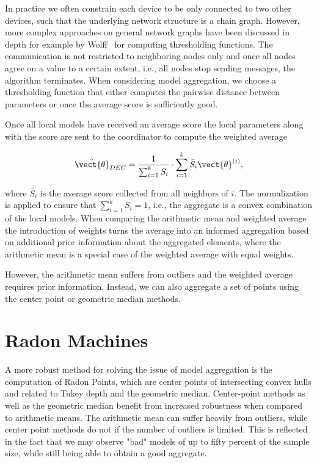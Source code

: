 

In practice we often constrain each device to be only connected to two other devices, such that  the underlying network structure is a chain graph.
However, more complex approaches on general network graphs have been discussed in depth for example by Wolff~\cite{wolff2013local} for computing thresholding functions.
The communication is not restricted to neighboring nodes only and once all nodes agree on a value to a certain extent, i.e., all nodes stop sending messages, the algorithm terminates.
When considering model aggregation, we choose a thresholding function that either computes the pairwise distance between parameters or once the average score is sufficiently good.

Once all local models have received an average score the local parameters along with the score are sent to the coordinator to compute the weighted average

\begin{equation}
    \label{eq:scorenorm}
    \tilde{\vect{\theta}}_{DEC} = \frac{1}{\sum_{i=1}^k S_i} \cdot \sum_{i=1}^k \bar{S}_i \vect{\theta}^{(i)},
\end{equation}

where $\bar{S}_i$ is the average score collected from all neighbors of $i$. 
The normalization is applied to ensure that $\sum_{i=1}^k S_i = 1$, i.e., the aggregate is a convex combination of the local models.
When comparing the arithmetic mean and weighted average the introduction of weights turns the average into an informed aggregation based on additional prior information about the aggregated elements, where the arithmetic mean is a special case of the weighted average with equal weights.

However, the arithmetic mean suffers from outliers and the weighted average requires prior information.
Instead, we can also aggregate a set of points using the center point or geometric median methods.

\section{Radon Machines}
\label{ssec:radon}
A more robust method for solving the issue of model aggregation is the computation of Radon Points, which are center points of intersecting convex hulls and related to Tukey depth and the geometric median. 
Center-point methods as well as the geometric median benefit from increased robustness when compared to arithmetic means.
The arithmetic mean can suffer heavily from outliers, while center point methods do not if the number of outliers is limited.
This is reflected in the fact that we may observe "bad" models of up to fifty percent of the sample size, while still being able to obtain a good aggregate.


